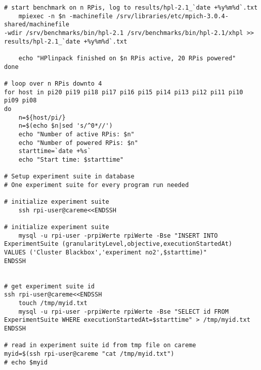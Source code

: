 \begin{verbatim}
# start benchmark on n RPis, log to results/hpl-2.1_`date +%y%m%d`.txt                        
    mpiexec -n $n -machinefile /srv/libraries/etc/mpich-3.0.4-shared/machinefile 
-wdir /srv/benchmarks/bin/hpl-2.1 /srv/benchmarks/bin/hpl-2.1/xhpl >> 
results/hpl-2.1_`date +%y%m%d`.txt

    echo "HPlinpack finished on $n RPis active, 20 RPis powered" 
done 

# loop over n RPis downto 4                                                           
for host in pi20 pi19 pi18 pi17 pi16 pi15 pi14 pi13 pi12 pi11 pi10 pi09 pi08
do
    n=${host/pi/}                                         
    n=$(echo $n|sed 's/^0*//')
    echo "Number of active RPis: $n"
    echo "Number of powered RPis: $n"
    starttime=`date +%s`
    echo "Start time: $starttime"

# Setup experiment suite in database
# One experiment suite for every program run needed 

# initialize experiment suite
    ssh rpi-user@careme<<ENDSSH                                                                                                                                                 

# initialize experiment suite                                                                                                                                               
	mysql -u rpi-user -prpiWerte rpiWerte -Bse "INSERT INTO 
ExperimentSuite (granularityLevel,objective,executionStartedAt) 
VALUES ('Cluster Blackbox','experiment no2',$starttime)"                                                                                                                                                                          
ENDSSH
                                                                                                                                                       

# get experiment suite id 
ssh rpi-user@careme<<ENDSSH                                                                                                                                                 
	touch /tmp/myid.txt                                                                                                                                                         
	mysql -u rpi-user -prpiWerte rpiWerte -Bse "SELECT id FROM 
ExperimentSuite WHERE executionStartedAt=$starttime" > /tmp/myid.txt                                             
ENDSSH

# read in experiment suite id from tmp file on careme 
myid=$(ssh rpi-user@careme "cat /tmp/myid.txt")
# echo $myid


\end{verbatim}
